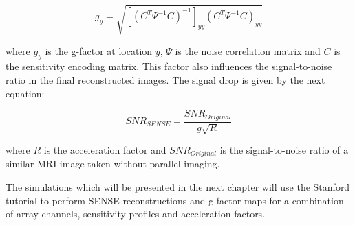 \begin{equation}
    g_y = \sqrt{ [(C^T \Psi^{-1} C )^{-1}]_{yy} (C^T \Psi^{-1} C )_{yy} }
\end{equation}

where $g_y$ is the g-factor at location $y$, $\Psi$ is the noise correlation matrix and $C$ is the sensitivity encoding matrix. This factor also influences the signal-to-noise ratio in the final reconstructed images. The signal drop is given by the next equation:

\begin{equation}
    SNR_{SENSE} = \frac{SNR_{Original}}{g \sqrt{R}}
\end{equation}

where $R$ is the acceleration factor and $SNR_{Original}$ is the signal-to-noise ratio of a similar MRI image taken without parallel imaging.

The simulations which will be presented in the next chapter will use the Stanford tutorial to perform SENSE reconstructions and g-factor maps for a combination of array channels, sensitivity profiles and acceleration factors.














